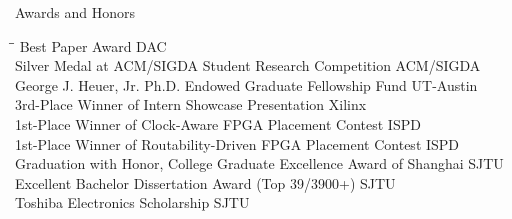 
\begin{rSection}{Awards and Honors}
\begin{tabbing}
\hspace{4.55in}\= \hspace{1.95in}\= \kill
Best Paper Award \> DAC  \\
Silver Medal at ACM/SIGDA Student Research Competition \> ACM/SIGDA  \\
George J. Heuer, Jr. Ph.D. Endowed Graduate Fellowship Fund \> UT-Austin  \\
3rd-Place Winner of Intern Showcase Presentation \> Xilinx  \\
1st-Place Winner of Clock-Aware FPGA Placement Contest \> ISPD  \\
1st-Place Winner of Routability-Driven FPGA Placement Contest \> ISPD  \\
Graduation with Honor, College Graduate Excellence Award of Shanghai \> SJTU  \\
Excellent Bachelor Dissertation Award (Top 39/3900+) \> SJTU  \\
Toshiba Electronics Scholarship \> SJTU  \\

\end{tabbing}
\end{rSection}

